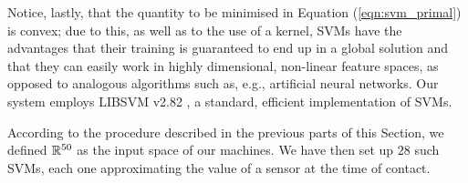 Notice, lastly, that the quantity to be minimised in Equation
(\ref{eqn:svm_primal}) is convex; due to this, as well as to the use
of a kernel, SVMs have the advantages that their training is
guaranteed to end up in a global solution and that they can easily
work in highly dimensional, non-linear feature spaces, as opposed to
analogous algorithms such as, e.g., artificial neural networks. Our
system employs LIBSVM v2.82 \cite{ChangL01}, a standard, efficient
implementation of SVMs.

According to the procedure described in the previous parts of this
Section, we defined $\mathbb{R}^{50}$ as the input space of our machines. We
have then set up $28$ such SVMs, each one approximating the value of a
sensor at the time of contact.
